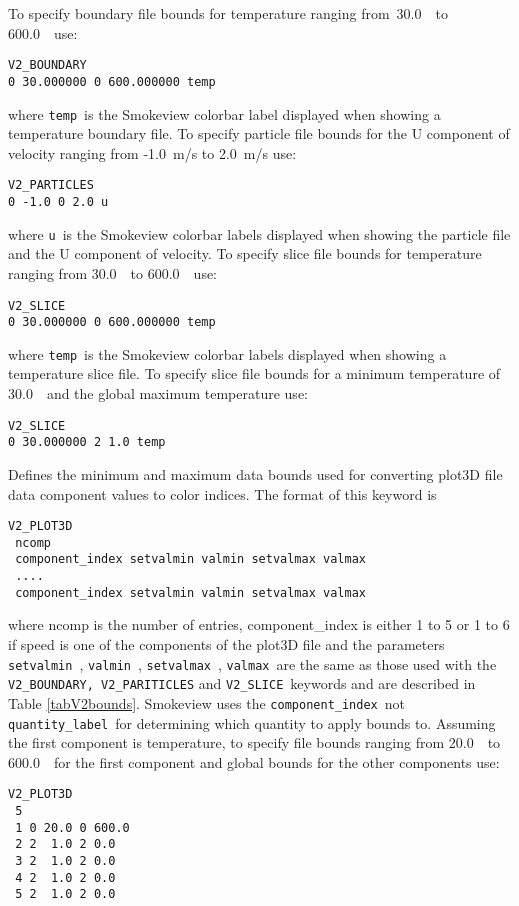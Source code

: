 \documentclass[11pt,twoside]{book}
\newcommand{\hitem}[1]{\item[{\bf #1} \hfill]}
\begin{document}
To specify boundary file bounds for temperature ranging from\
30.0~\degC\ to 600.0~\degC\ use:
\begin{lstlisting}
V2_BOUNDARY
0 30.000000 0 600.000000 temp
\end{lstlisting}
where {\tt temp}\ is the Smokeview colorbar label displayed when
showing a temperature boundary file.
To specify particle file bounds for the U component of velocity ranging from
-1.0~m/s to 2.0~m/s use:
\begin{lstlisting}
V2_PARTICLES
0 -1.0 0 2.0 u
\end{lstlisting}
where {\tt u}\ is the Smokeview colorbar labels displayed when
showing the particle file and the U component of velocity.
To specify slice file bounds for temperature ranging from
30.0~\degC\ to 600.0~\degC\ use:
\begin{lstlisting}
V2_SLICE
0 30.000000 0 600.000000 temp
\end{lstlisting}
where {\tt temp}\ is the Smokeview colorbar labels displayed when
showing a temperature slice file.
To specify slice file bounds for a minimum temperature of
30.0~\degC\ and the global maximum temperature use:
\begin{lstlisting}
V2_SLICE
0 30.000000 2 1.0 temp
\end{lstlisting}





\hitem{V2\_PLOT3D}Defines the minimum and maximum
data bounds used for converting plot3D file data component values to color indices.
The format of this keyword is
\begin{lstlisting}
V2_PLOT3D
 ncomp
 component_index setvalmin valmin setvalmax valmax
 ....
 component_index setvalmin valmin setvalmax valmax
\end{lstlisting}
where ncomp is the number of entries,
component\_index is either 1 to 5 or 1 to 6 if speed is one of the components of
the plot3D file  and
the parameters {\tt setvalmin}\ , {\tt valmin}\ ,  {\tt setvalmax}\ , {\tt valmax}\  are the same
as those used with the {\tt V2\_BOUNDARY, V2\_PARITICLES} and {\tt V2\_SLICE}\ keywords and are
described in Table \ref{tabV2bounds}. Smokeview uses the {\tt component\_index}\ not {\tt quantity\_label}\
for determining which quantity to apply bounds to.
Assuming the first component is temperature, to specify file bounds ranging from 20.0~\degC\ to
600.0~\degC\ for the first component and global bounds for the other components use:
\begin{lstlisting}
V2_PLOT3D
 5
 1 0 20.0 0 600.0
 2 2  1.0 2 0.0
 3 2  1.0 2 0.0
 4 2  1.0 2 0.0
 5 2  1.0 2 0.0
\end{lstlisting}
\end{document}
